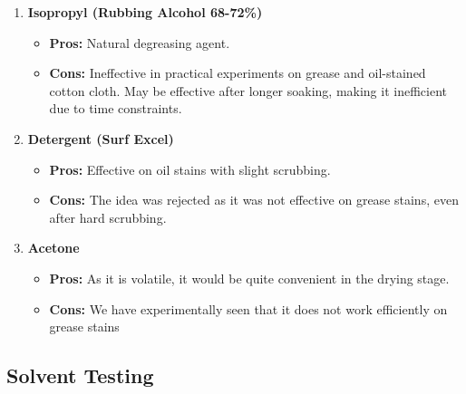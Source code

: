 \documentclass[table,french,english]{rapportCS}
\begin{document}
\begin{enumerate}
    \item \textbf{Isopropyl (Rubbing Alcohol 68-72\%)}
    \begin{itemize}[label=$\bullet$]
        \item \textbf{Pros:} Natural degreasing agent.
        \item \textbf{Cons:} Ineffective in practical experiments on grease and oil-stained cotton cloth. May be effective after longer soaking, making it inefficient due to time constraints.
    \end{itemize}
    \item \textbf{Detergent (Surf Excel)}
    \begin{itemize}[label=$\bullet$]
        \item \textbf{Pros:} Effective on oil stains with slight scrubbing.
        \item \textbf{Cons:} The idea was rejected as it was not effective on grease stains, even after hard scrubbing.
    \end{itemize}
    \item \textbf{Acetone}
    \begin{itemize}[label=$\bullet$]
        \item \textbf{Pros:} As it is volatile, it would be quite convenient in the drying stage.

        \item \textbf{Cons:} We have experimentally seen that it does not work efficiently on grease stains

    \end{itemize}
\end{enumerate}
\newpage

\subsection{Solvent Testing}
\end{document}
